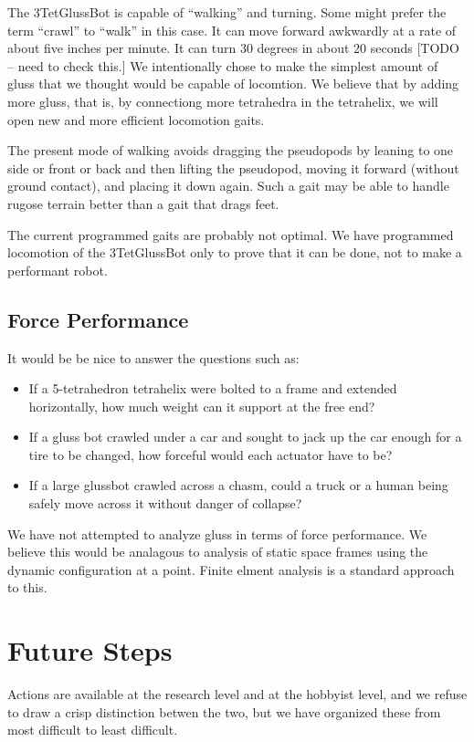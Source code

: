 \documentclass[12pt]{article}
\begin{document}
The 3TetGlussBot is capable of ``walking'' and turning. Some might prefer the term ``crawl'' to ``walk'' in
this case. It can move forward awkwardly at a rate
of about five inches per minute. It can turn 30 degrees in about 20 seconds [TODO -- need to check this.]
We intentionally chose to make the simplest amount of gluss that we thought would be capable of locomtion.
We believe that by adding more gluss, that is, by connectiong more tetrahedra in the tetrahelix,
we will open new and more efficient locomotion gaits.

The present mode of walking avoids dragging the pseudopods by leaning to one side or front or back and
then lifting the pseudopod, moving it forward (without ground contact), and placing it down again.
Such a gait may be able to handle rugose terrain better than a gait that drags feet.

The current programmed gaits are probably not optimal.
We have programmed locomotion of the 3TetGlussBot only to prove that it can be done, not to make
a performant robot.

\subsection{Force Performance}

It would be be nice to answer the questions such as:
\begin{itemize}  
\item If a 5-tetrahedron tetrahelix were bolted to a frame and extended horizontally, how much
  weight can it support at the free end?
\item If a gluss bot crawled under a car and sought to jack up the car enough for a tire
  to be changed, how forceful would each actuator have to be?
\item If a large glussbot crawled across a chasm, could a truck or a human being safely move
  across it without danger of collapse?
\end{itemize}

We have not attempted to analyze gluss in terms of force performance. We believe this would
be analagous to analysis of static space frames using the dynamic configuration at a point.
Finite elment analysis is a standard approach to this.

\section{Future Steps}

Actions are available at the research level and at the hobbyist level, and we refuse to draw
a crisp distinction betwen the two, but we have organized these from most difficult to least
difficult.
\end{document}
